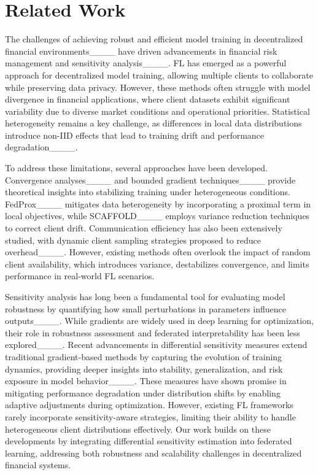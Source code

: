 \section{Related Work}
\label{related}
The challenges of achieving robust and efficient model training in decentralized financial environments____ have driven advancements in financial risk management and sensitivity analysis____. FL has emerged as a powerful approach for decentralized model training, allowing multiple clients to collaborate while preserving data privacy. However, these methods often struggle with model divergence in financial applications, where client datasets exhibit significant variability due to diverse market conditions and operational priorities. Statistical heterogeneity remains a key challenge, as differences in local data distributions introduce non-IID effects that lead to training drift and performance degradation____.


To address these limitations, several approaches have been developed. Convergence analyses____ and bounded gradient techniques____ provide theoretical insights into stabilizing training under heterogeneous conditions. FedProx____ mitigates data heterogeneity by incorporating a proximal term in local objectives, while SCAFFOLD____ employs variance reduction techniques to correct client drift. Communication efficiency has also been extensively studied, with dynamic client sampling strategies proposed to reduce overhead____. However, existing methods often overlook the impact of random client availability, which introduces variance, destabilizes convergence, and limits performance in real-world FL scenarios.

Sensitivity analysis has long been a fundamental tool for evaluating model robustness by quantifying how small perturbations in parameters influence outputs____. While gradients are widely used in deep learning for optimization, their role in robustness assessment and federated interpretability has been less explored____. Recent advancements in differential sensitivity measures extend traditional gradient-based methods by capturing the evolution of training dynamics, providing deeper insights into stability, generalization, and risk exposure in model behavior____. These measures have shown promise in mitigating performance degradation under distribution shifts by enabling adaptive adjustments during optimization. However, existing FL frameworks rarely incorporate sensitivity-aware strategies, limiting their ability to handle heterogeneous client distributions effectively. Our work builds on these developments by integrating differential sensitivity estimation into federated learning, addressing both robustness and scalability challenges in decentralized financial systems.


